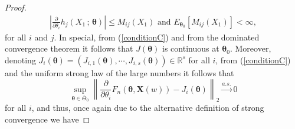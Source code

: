 \documentclass[lineno]{biometrika}
\newcommand{\R}{\mathbb{R}}
\newcommand{\bs}{\boldsymbol}
\begin{document}
\begin{proof}
\begin{equation}
\begin{aligned}
 \left|\frac{\partial}{\partial \theta_i}h_j(X_1\, ;\, \bs{\theta})\right|\leq M_{ij}(X_1)\mbox{ and }E_{\bs{\theta}_0}\left[M_{ij}(X_1)\right]<\infty,
 \end{aligned}
 \end{equation}
for all $i$ and $j$. In special, from (\ref{conditionC}) and from the dominated convergence theorem it follows that $J(\bs{\theta})$ is continuous at $\bs{\theta}_0$. Moreover, denoting $J_i(\bs{\theta})=\left(J_{i,1}(\bs{\theta}),\cdots,J_{i,s}(\bs{\theta})\right)\in \R^s$ for all $i$, from (\ref{conditionC}) and the uniform strong law of the large numbers it follows that
\begin{equation*}\sup_{\bs{\theta}\in \overline{\Theta}_0}\left\|\frac{\partial }{\partial \theta_i}F_n(\bs{\theta},\bs{X}(w)) - J_i(\bs{\theta})\right\|_2 \overset{a.s.}{\to} 0
\end{equation*}
for all $i$, and thus, once again due to the alternative definition of strong convergence we have


\end{proof}
\end{document}
